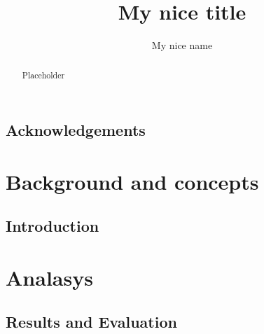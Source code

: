 \documentclass{uiophd}
\title{My nice title}
\author{My nice name}
\begin{document}
\uiosloforside[kind={Master thesis}]

\setlength{\oddsidemargin}{35pt}
\setlength{\evensidemargin}{35pt}
\setlength{\marginparwidth}{35pt}
\setlength{\footskip}{30pt}

\makeatletter

\def\cleardoublepage{\clearpage\if@twoside \ifodd\c@page\else
  \hbox{}
  \thispagestyle{plain}
  \newpage
  \if@twocolumn\hbox{}\newpage\fi\fi\fi}
\makeatother \clearpage{\pagestyle{plain}\cleardoublepage}

\begin{abstract}
  Placeholder
\end{abstract}

\chapter*{Acknowledgements}

\tableofcontents

\listoffigures

\listoftables

\pagestyle{plain}



\part{Background and concepts}

\chapter{Introduction}
\label{chap:introduction}




\part{Analasys}

\chapter{Results and Evaluation}
\label{chap:results and evaluation}

\end{document}
